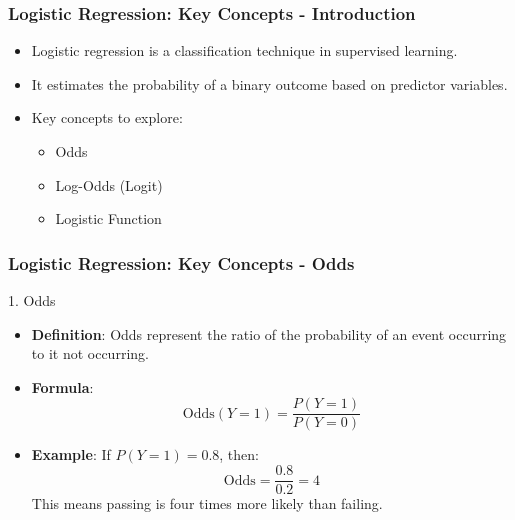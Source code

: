 \documentclass[aspectratio=169]{beamer}
\begin{document}
\begin{frame}[fragile]
    \frametitle{Logistic Regression: Key Concepts - Introduction}
    \begin{itemize}
        \item Logistic regression is a classification technique in supervised learning.
        \item It estimates the probability of a binary outcome based on predictor variables.
        \item Key concepts to explore: 
        \begin{itemize}
            \item Odds
            \item Log-Odds (Logit)
            \item Logistic Function
        \end{itemize}
    \end{itemize}
\end{frame}

\begin{frame}[fragile]
    \frametitle{Logistic Regression: Key Concepts - Odds}
    \begin{block}{1. Odds}
        \begin{itemize}
            \item \textbf{Definition}: Odds represent the ratio of the probability of an event occurring to it not occurring.
            \item \textbf{Formula}:
            \begin{equation}
                \text{Odds}(Y=1) = \frac{P(Y=1)}{P(Y=0)}
            \end{equation}
            \item \textbf{Example}: If $P(Y=1) = 0.8$, then:
            \begin{equation}
                \text{Odds} = \frac{0.8}{0.2} = 4
            \end{equation}
            This means passing is four times more likely than failing.
        \end{itemize}
    \end{block}
\end{frame}
\end{document}
